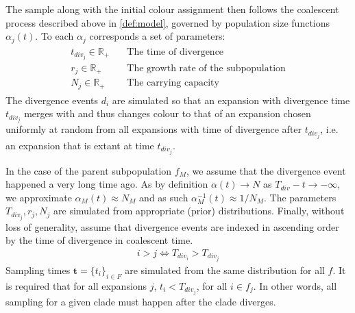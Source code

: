 \documentclass{report}
\newcommand{\R}{\mathbb{R}}
\theoremstyle{definition}
\begin{document}
The sample along with the initial colour assignment then follows the coalescent process described above in \ref{def:model}, governed by population size functions $\alpha_{j}(t)$. To each $\alpha_{j}$ corresponds a set of parameters:
\begin{gather}
\begin{aligned}
t_{div_{j}}\in\R_+ \quad&\text{The time of divergence}\\
r_j\in\R_+\quad&\text{The growth rate of the subpopulation}\\
N_j\in\R_+\quad&\text{The carrying capacity}
\end{aligned}
\end{gather}
The divergence events $d_i$ are simulated so that an expansion with divergence time $t_{div_j}$ merges with and thus changes colour to that of an expansion chosen uniformly at random from all expansions with time of divergence after $t_{div_j}$, i.e. an expansion that is extant at time $t_{div_j}$.

In the case of the parent subpopulation $f_{M}$, we assume that the divergence event happened a very long time ago. As by definition $\alpha(t) \rightarrow N$ as $T_{div}-t\rightarrow -\infty$, we approximate $\alpha_{M}(t) \approx N_{M}$ and as such $\alpha^{-1}_{M}(t) \approx 1/N_{M}$. The parameters $T_{div_{j}}, r_j, N_j$ are simulated from appropriate (prior) distributions.
Finally, without loss of generality, assume that divergence events are indexed in ascending order by the time of divergence in coalescent time.
\begin{gather}
i > j \Leftrightarrow T_{div_i} > T_{div_j}  
\end{gather}
Sampling times $\mathbf{t}=\{t_i\}_{i\in F}$ are simulated from the same distribution for all $f$. It is required that for all expansions $j$, $t_i < T_{div_j}$, for all $i \in f_j$. In other words, all sampling for a given clade must happen after the clade diverges.
\end{document}
